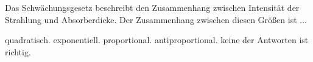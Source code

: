 \documentclass[11pt]{exam}
\begin{document}
\begin{questions}
\vspace{3mm}\question Das Schwächungsgesetz beschreibt den Zusammenhang zwischen Intensität der Strahlung und Absorberdicke. Der Zusammenhang zwischen diesen Größen ist ...

\begin{choices}
	\choice quadratisch.
	\choice exponentiell.
	\choice proportional.
	\choice antiproportional.
	\choice keine der Antworten ist richtig.
\end{choices}

\vspace{3mm}\end{questions}
\end{document}
